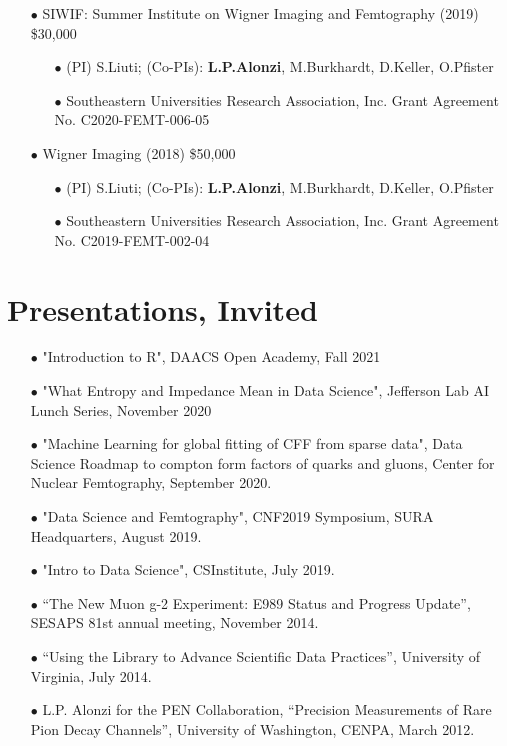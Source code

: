 \documentclass{article}[10pt]
\begin{document}
\begin{itemize}
\begin{itemize}
\end{itemize}
\item[$\bullet$] SIWIF: Summer Institute on Wigner Imaging and Femtography (2019) \$30,000
\begin{itemize}
\item[$\bullet$] (PI) S.Liuti; (Co-PIs): {\bf L.P.Alonzi}, M.Burkhardt, D.Keller, O.Pfister
\item[$\bullet$] Southeastern Universities Research Association, Inc. Grant Agreement No. C2020-FEMT-006-05
\end{itemize}
\end{itemize}\begin{itemize}
\item[$\bullet$] Wigner Imaging (2018) \$50,000
\begin{itemize}
\item[$\bullet$] (PI) S.Liuti; (Co-PIs): {\bf L.P.Alonzi}, M.Burkhardt, D.Keller, O.Pfister
\item[$\bullet$] Southeastern Universities Research Association, Inc. Grant Agreement No. C2019-FEMT-002-04
\end{itemize}
\end{itemize}




\section*{Presentations, Invited}


\begin{itemize}
\item [$\bullet$] "Introduction to R", DAACS Open Academy, Fall 2021
\item [$\bullet$] "What Entropy and Impedance Mean in Data Science", Jefferson Lab AI Lunch Series, November 2020
\item [$\bullet$] "Machine Learning for global fitting of CFF from sparse data", Data Science Roadmap to compton form factors of quarks and gluons, Center for Nuclear Femtography, September 2020.
\item [$\bullet$] "Data Science and Femtography", CNF2019 Symposium, SURA Headquarters, August 2019.
\item [$\bullet$] "Intro to Data Science", CSInstitute, July 2019.
\item [$\bullet$] ``The New Muon g-2 Experiment: E989 Status and Progress Update'', SESAPS 81st annual meeting, November 2014.
\item [$\bullet$] ``Using the Library to Advance Scientific Data Practices'', University of Virginia, July 2014.
\item [$\bullet$] L.P. Alonzi for the PEN Collaboration, ``Precision Measurements of Rare Pion Decay Channels'', University of Washington, CENPA, March 2012.
\end{itemize}
\end{document}
